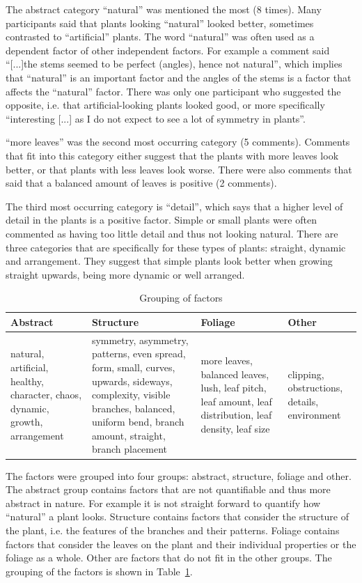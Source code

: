 The abstract category ``natural'' was mentioned the most (8 times).
Many participants said that plants looking ``natural'' looked better, sometimes contrasted to ``artificial'' plants.
The word ``natural'' was often used as a dependent factor of other independent factors.
For example a comment said ``[...]the stems seemed to be perfect (angles), hence not natural'', which implies that ``natural'' is an important factor and the angles of the stems is a factor that affects the ``natural'' factor.
There was only one participant who suggested the opposite, i.e. that artificial-looking plants looked good, or more specifically ``interesting [...] as I do not expect to see a lot of symmetry in plants''.

``more leaves'' was the second most occurring category (5 comments).
Comments that fit into this category either suggest that the plants with more leaves look better, or that plants with less leaves look worse.
There were also comments that said that a balanced amount of leaves is positive (2 comments).

The third most occurring category is ``detail'', which says that a higher level of detail in the plants is a positive factor.
Simple or small plants were often commented as having too little detail and thus not looking natural.
There are three categories that are specifically for these types of plants: straight, dynamic and arrangement.
They suggest that simple plants look better when growing straight upwards, being more dynamic or well arranged.

\begin{table}
    \centering
    \begin{tabularx}{\textwidth}{| X | X | X | X |}
    \hline
    Abstract & Structure & Foliage & Other \\
    \hline
    natural, artificial, healthy, character, chaos, dynamic, growth, arrangement &
    symmetry, asymmetry, patterns, even spread, form, small, curves, upwards, sideways, complexity, visible branches, balanced, uniform bend, branch amount, straight, branch placement &
    more leaves, balanced leaves, lush, leaf pitch, leaf amount, leaf distribution, leaf density, leaf size &
    clipping, obstructions, details, environment \\
    \hline
    \end{tabularx}
    \caption{Grouping of factors}
    \label{tab:factor-groups}
\end{table}

The factors were grouped into four groups: abstract, structure, foliage and other.
The abstract group contains factors that are not quantifiable and thus more abstract in nature.
For example it is not straight forward to quantify how ``natural'' a plant looks.
Structure contains factors that consider the structure of the plant, i.e. the features of the branches and their patterns.
Foliage contains factors that consider the leaves on the plant and their individual properties or the foliage as a whole.
Other are factors that do not fit in the other groups.
The grouping of the factors is shown in Table~\ref{tab:factor-groups}.

